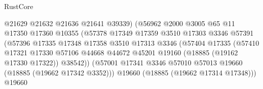\begin{lexlean}{RustCore}
\begin{coremodule}
                                          @21629
                                          @21632
                                          @21636
                                          @21641
                                          @39339)
                                        (@56962
                                          @2000
                                          @3005
                                          @65
                                          @11
                                          @17350
                                          @17360
                                          @10355
                                          (@57378
                                            @17349
                                            @17359
                                            @3510
                                            @17303
                                            @3346
                                            @57391
                                            (@57396
                                              @17335
                                              @17348
                                              @17358
                                              @3510
                                              @17313
                                              @3346
                                              (@57404
                                                @17335
                                                (@57410
                                                  @17321
                                                  @17330
                                                  @57106
                                                  @44668
                                                  @44672
                                                  @45201
                                                  @19160
                                                  (@18885 (@19162 @17330 @17322))
                                                  @38542))
                                              (@57001
                                                @17341
                                                @3346
                                                @57010
                                                @57013
                                                @19660
                                                (@18885 (@19662 @17342 @3352)))
                                              @19660
                                              (@18885 (@19662 @17314 @17348)))
                                            @19660

\end{coremodule}
\end{lexlean}
